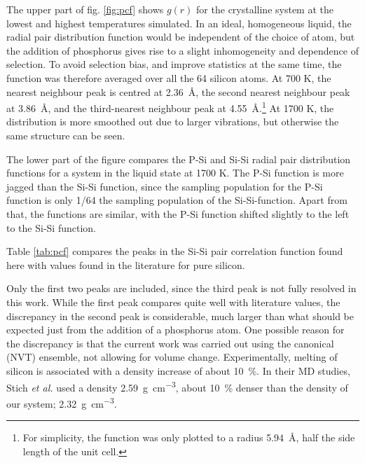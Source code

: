 \documentclass[11pt,bibliography=totoc,index=totoc]{scrbook}   %
\begin{document}
The upper part of fig. \ref{fig:pcf} shows $g(r)$ for the crystalline system at the lowest and highest temperatures simulated.
In an ideal, homogeneous liquid, the radial pair distribution function would be independent of the choice of atom, but the addition of phosphorus gives rise to a slight inhomogeneity and dependence of selection.
To avoid selection bias, and improve statistics at the same time, the function was therefore averaged over all the 64 silicon atoms.
At 700 K, the nearest neighbour peak is centred at \SI{2.36}{\angstrom}, 
the second nearest neighbour peak at \SI{3.86}{\angstrom}, and the 
third-nearest neighbour peak at \SI{4.55}{\angstrom}.\footnote{
    For simplicity, the function was only plotted to a radius \SI{5.94}{\angstrom}, half the side length of the unit cell.}
At 1700 K, the distribution is more smoothed out due to larger vibrations, but otherwise the same structure can be seen.

The lower part of the figure compares the P-Si and Si-Si radial pair distribution functions for a system in the liquid state at 1700 K.
The P-Si function is more jagged than the Si-Si function, since the sampling population for the P-Si function is only 1/64 the sampling population of the Si-Si-function.
Apart from that, the functions are similar, with the P-Si function shifted slightly to the left to the Si-Si function. 

Table \ref{tab:pcf} compares the peaks in the Si-Si pair correlation function found here with values found in the literature for pure silicon. 

Only the first two peaks are included, since the third peak is not fully resolved in this work.
While the first peak compares quite well with literature values, the discrepancy in the second peak is considerable, much
larger than what should be expected just from the addition of a phosphorus atom.
One possible reason for the discrepancy is that the current work was carried out using the canonical (NVT) ensemble, 
not allowing for volume change. 
Experimentally, melting of silicon is associated with a density increase of about 10~\%.\cite{Waseda:1980}
In their MD studies, Stich \textit{et al.} used a density \SI{2.59}{\gram\per\centi\metre\cubed}, about 10~\% denser than the density of our system; \SI{2.32}{\gram\per\centi\metre\cubed}.
\end{document}
